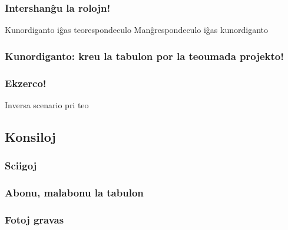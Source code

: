 \documentclass{beamer}
\begin{document}
  \begin{frame}
    \frametitle{Intershanĝu la rolojn!}
    Kunordiganto iĝas teorespondeculo
    Manĝrespondeculo iĝas kunordiganto
  \end{frame}

  \begin{frame}
    \frametitle{Kunordiganto: kreu la tabulon por la teoumada projekto!}
    
  \end{frame}

  \begin{frame}
    \frametitle{Ekzerco!}

    Inversa scenario pri teo
  \end{frame}


\subsection{Konsiloj}
  \begin{frame}
    \frametitle{Sciigoj}

  \end{frame}


  \begin{frame}
    \frametitle{Abonu, malabonu la tabulon}

  \end{frame}



  \begin{frame}
    \frametitle{Fotoj gravas}

  \end{frame}
\end{document}
